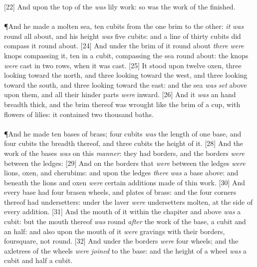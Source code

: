 [22] \textcolor[cmyk]{0.99998,1,0,0}{And upon the top of the  \emph{was} lily work: so was the work of the  finished.}\\
\\
\P \textcolor[cmyk]{0.99998,1,0,0}{And he made a molten sea, ten cubits from the one brim to the other: \emph{it} \emph{was} round all about, and his height \emph{was} five cubits: and a line of thirty cubits did compass it round about.}
[24] \textcolor[cmyk]{0.99998,1,0,0}{And under the brim of it round about \emph{there} \emph{were} knops compassing it, ten in a cubit, compassing the sea round about: the knops \emph{were} cast in two rows, when it was cast.}
[25] \textcolor[cmyk]{0.99998,1,0,0}{It stood upon twelve oxen, three looking toward the north, and three looking toward the west, and three looking toward the south, and three looking toward the east: and the sea \emph{was} \emph{set} above upon them, and all their hinder parts \emph{were} inward.}
[26] \textcolor[cmyk]{0.99998,1,0,0}{And it \emph{was} an hand breadth thick, and the brim thereof was wrought like the brim of a cup, with flowers of lilies: it contained two thousand baths.}\\
\\
\P \textcolor[cmyk]{0.99998,1,0,0}{And he made ten bases of brass; four cubits \emph{was} the length of one base, and four cubits the breadth thereof, and three cubits the height of it.}
[28] \textcolor[cmyk]{0.99998,1,0,0}{And the work of the bases \emph{was} on this \emph{manner}: they had borders, and the borders \emph{were} between the ledges:}
[29] \textcolor[cmyk]{0.99998,1,0,0}{And on the borders that \emph{were} between the ledges \emph{were} lions, oxen, and cherubims: and upon the ledges \emph{there} \emph{was} a base above: and beneath the lions and oxen \emph{were} certain additions made of thin work.}
[30] \textcolor[cmyk]{0.99998,1,0,0}{And every base had four brasen wheels, and plates of brass: and the four corners thereof had undersetters: under the laver \emph{were} undersetters molten, at the side of every addition.}
[31] \textcolor[cmyk]{0.99998,1,0,0}{And the mouth of it within the chapiter and above \emph{was} a cubit: but the mouth thereof \emph{was} round \emph{after} the work of the base, a cubit and an half: and also upon the mouth of it \emph{were} gravings with their borders, foursquare, not round.}
[32] \textcolor[cmyk]{0.99998,1,0,0}{And under the borders \emph{were} four wheels; and the axletrees of the wheels \emph{were} \emph{joined} to the base: and the height of a wheel \emph{was} a cubit and half a cubit.}
